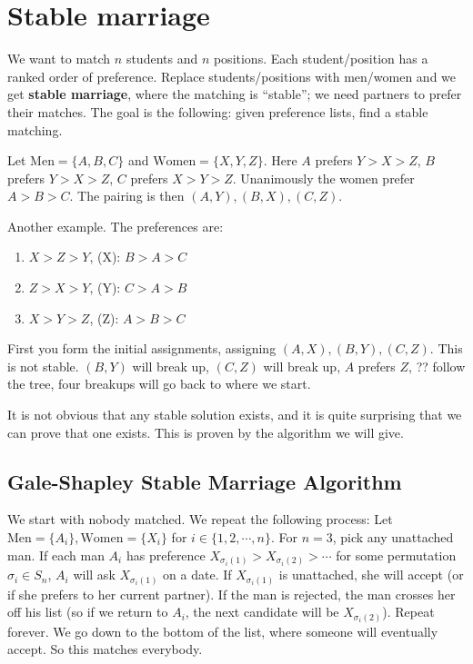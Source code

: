 \section{Stable marriage} 
We want to match $n$ students and $n$ positions. Each student/position has a ranked order of preference. Replace students/positions with men/women and we get \textbf{stable marriage}, where the matching is ``stable''; we need partners to prefer their matches. The goal is the following: given preference lists, find a stable matching.

\begin{example}
Let $\mathrm{Men}=\{A,B,C\} $ and $\mathrm{Women}=\{X,Y,Z\} $. Here $A$ prefers $Y>X>Z$, $B$ prefers $Y>X>Z$, $C$ prefers $X>Y>Z$. Unanimously the women prefer $A>B>C$. The pairing is then $(A,Y),(B,X),(C,Z)$.

Another example. The preferences are:
\begin{enumerate}[label=(\Alph*)]
\setlength\itemsep{-.2em}
    \item $X>Z>Y$, (X): $B>A>C$
    \item $Z>X>Y $, (Y): $C>A>B$
    \item $X>Y>Z$, (Z): $A>B>C$
\end{enumerate}
First you form the initial assignments, assigning $(A,X),(B,Y),(C,Z)$. This is not stable. $(B,Y)$ will break up, $(C,Z)$ will break up, $A$ prefers  $Z$, ?? follow the tree, four breakups will go back to where we start. 
\end{example}It is not obvious that any stable solution exists, and it is quite surprising that we can prove that one exists. This is proven by the algorithm we will give.

\subsection{Gale-Shapley Stable Marriage Algorithm}
We start with nobody matched. We repeat the following process: Let $\mathrm{Men}=\{A_i \} ,\mathrm{Women}=\{X_i \} $ for $i \in \{1,2,\cdots ,n\} $. For $n=3$, pick any unattached man. If each man $A_i $ has preference $X_{\sigma_i (1)} >X_{\sigma_i (2)}  >\cdots $ for some permutation $\sigma_i  \in S_n $, $A_i $ will ask $X_{\sigma_i (1)}$ on a date. If $X_{\sigma_i (1)}$ is unattached, she will accept (or if she prefers to her current partner). If the man is rejected, the man crosses her off his list (so if we return to $A_i $, the next candidate will be $X_{\sigma_i (2)}$). Repeat forever. We go down to the bottom of the list, where someone will eventually accept. So this matches everybody.

